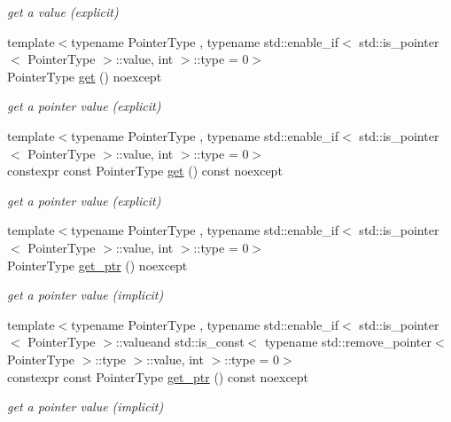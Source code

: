 \begin{DoxyCompactItemize}
\begin{DoxyCompactList}\small\item\em get a value (explicit) \end{DoxyCompactList}\item 
{\footnotesize template$<$typename Pointer\-Type , typename std\-::enable\-\_\-if$<$ std\-::is\-\_\-pointer$<$ Pointer\-Type $>$\-::value, int $>$\-::type  = 0$>$ }\\Pointer\-Type \hyperlink{classnlohmann_1_1basic__json_ac5693cff1df0775cd3fbe960412cde4b}{get} () noexcept
\begin{DoxyCompactList}\small\item\em get a pointer value (explicit) \end{DoxyCompactList}\item 
{\footnotesize template$<$typename Pointer\-Type , typename std\-::enable\-\_\-if$<$ std\-::is\-\_\-pointer$<$ Pointer\-Type $>$\-::value, int $>$\-::type  = 0$>$ }\\constexpr const Pointer\-Type \hyperlink{classnlohmann_1_1basic__json_a9008c688b9bd5798e4090c971d20ee92}{get} () const noexcept
\begin{DoxyCompactList}\small\item\em get a pointer value (explicit) \end{DoxyCompactList}\item 
{\footnotesize template$<$typename Pointer\-Type , typename std\-::enable\-\_\-if$<$ std\-::is\-\_\-pointer$<$ Pointer\-Type $>$\-::value, int $>$\-::type  = 0$>$ }\\Pointer\-Type \hyperlink{classnlohmann_1_1basic__json_a7ab11375ed2e29c2fcb6119386851445}{get\-\_\-ptr} () noexcept
\begin{DoxyCompactList}\small\item\em get a pointer value (implicit) \end{DoxyCompactList}\item 
{\footnotesize template$<$typename Pointer\-Type , typename std\-::enable\-\_\-if$<$ std\-::is\-\_\-pointer$<$ Pointer\-Type $>$\-::valueand std\-::is\-\_\-const$<$ typename std\-::remove\-\_\-pointer$<$ Pointer\-Type $>$\-::type $>$\-::value, int $>$\-::type  = 0$>$ }\\constexpr const Pointer\-Type \hyperlink{classnlohmann_1_1basic__json_a9780ea9bb66b6191cb087b14396972c1}{get\-\_\-ptr} () const noexcept
\begin{DoxyCompactList}\small\item\em get a pointer value (implicit) \end{DoxyCompactList}\item 

\end{DoxyCompactItemize}
